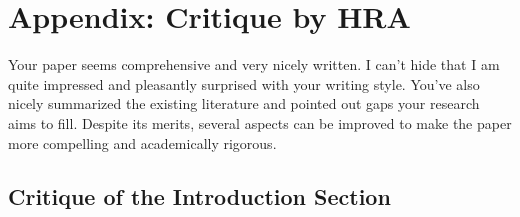 \section{Appendix: Critique by HRA}\label{sec:appendix}

Your paper seems comprehensive and very nicely written. I can't hide that I am quite impressed and pleasantly surprised with your writing style. You've also nicely summarized the existing literature and pointed out gaps your research aims to fill. Despite its merits, several aspects can be improved to make the paper more compelling and academically rigorous.

\subsection{Critique of the Introduction Section}

